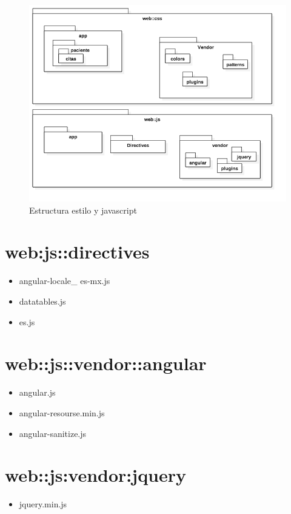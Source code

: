 	\begin{figure}[htbp!]
		\centering
			\includegraphics[width=1\textwidth]{images/logico35}
		\caption{Estructura estilo y javascript}
	\end{figure}
		
		
	\newpage
	\section{web:js::directives}
	\begin{itemize}
		\item angular-locale\_ es-mx.js
		\item datatables.js
		\item es.js
	\end{itemize}
	
	\section{web::js::vendor::angular}
	\begin{itemize}
		\item angular.js
		\item angular-resourse.min.js
		\item angular-sanitize.js
		
	\end{itemize}		
	\section{web::js:vendor:jquery}
	\begin{itemize}
		\item jquery.min.js
\end{itemize}		
	
